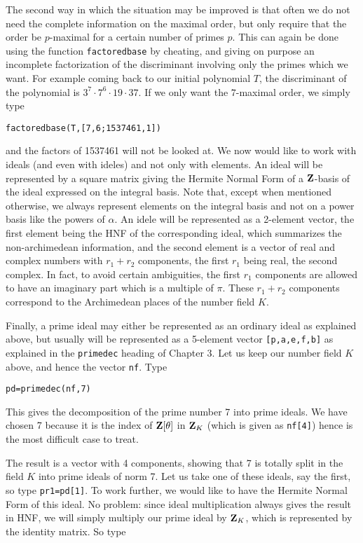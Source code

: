 The second way in which the situation may be improved is that often we do not
need the complete information on the maximal order, but only require that the
order be $p$-maximal for a certain number of primes $p$. This can again be 
done using the function {\tt factoredbase} by cheating, and giving on purpose
an incomplete factorization of the discriminant involving only the primes
which we want. For example coming back to our initial polynomial $T$, 
the discriminant of the polynomial is $3^7\cdot7^6\cdot19\cdot37$. If we only
want the $7$-maximal order, we simply type

\centerline{\tt factoredbase(T,[7,6;1537461,1])}

and the factors of 1537461 will not be looked at.
\medskip
We now would like to work with ideals (and even with ideles) and not only
with elements. An ideal will be represented by a square matrix giving the
Hermite Normal Form of a ${\bf Z}$-basis of the ideal expressed on the
integral basis. Note that, except when mentioned otherwise, we always
represent elements on the integral basis and not on a power basis like
the powers of $\alpha$. An idele will be represented as a 2-element
vector, the first element being the HNF of the corresponding ideal,
which summarizes the non-archimedean information, and the second
element is a vector of real and complex numbers with $r_1+r_2$ components,
the first $r_1$ being real, the second complex. In fact, to avoid
certain ambiguities, the first $r_1$ components are allowed to
have an imaginary part which is a multiple of $\pi$. These $r_1+r_2$
components correspond to the Archimedean places of the number field
$K$.

Finally, a prime ideal may either be represented as an ordinary ideal
as explained above, but usually will be represented as a 5-element
vector {\tt [p,a,e,f,b]} as explained in the {\tt primedec} heading of
Chapter 3.
\medskip
Let us keep our number field $K$ above, and hence the vector {\tt nf}.
Type 

\centerline{\tt pd=primedec(nf,7)}

This gives the decomposition of the prime
number 7 into prime ideals. We have chosen 7 because it is the index
of ${\bf Z}[\theta]$ in ${\bf Z}_K$ (which is given as {\tt nf[4]}) hence is the
most difficult case to treat.

The result is a vector with 4 components, showing that 7 is totally
split in the field $K$ into prime ideals of norm 7. Let us take
one of these ideals, say the first, so type {\tt pr1=pd[1]}.
To work further, we would like to have the Hermite Normal Form of this
ideal. No problem: since ideal multiplication always gives the result
in HNF, we will simply multiply our prime ideal by ${\bf Z}_K$, which is
represented by the identity matrix. So type

